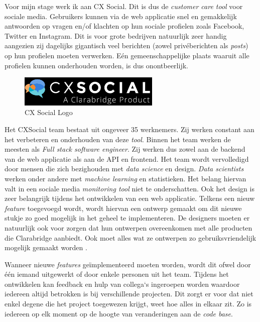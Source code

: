 Voor mijn stage werk ik aan CX Social. Dit is dus de \textit{customer care tool} voor sociale media. Gebruikers kunnen via de web applicatie snel en gemakkelijk antwoorden op vragen en/of klachten op hun sociale profielen zoals Facebook, Twitter en Instagram. Dit is voor grote bedrijven natuurlijk zeer handig aangezien zij dagelijks gigantisch veel berichten (zowel priv\'{e}berichten als \textit{posts}) op hun profielen moeten verwerken. E\'{e}n gemeenschappelijke plaats waaruit alle profielen kunnen onderhouden worden, is dus onontbeerlijk. 

\begin{figure}[H]
	\centering
	\includegraphics[width=0.6\textwidth]{Figuren/CXSocialLogo.png}
	\caption{CX Social Logo \cite{CXSOcialLogo}} 
	\label{fig:CXSocialLogo}
\end{figure} 

Het CXSocial team bestaat uit ongeveer 35 werknemers. Zij werken constant aan het verbeteren en onderhouden van deze \textit{tool}.  Binnen het team werken de meesten als \textit{Full stack software engineer}. Zij werken dus zowel aan de backend van de web applicatie als aan de API en frontend. Het team wordt vervolledigd door mensen die zich bezighouden met \textit{data science} en design. \textit{Data scientists} werken onder andere met \textit{machine learning} en statistieken. Het belang hiervan valt in een sociale media \textit{monitoring tool} niet te onderschatten. Ook het design is zeer belangrijk tijdens het ontwikkelen van een web applicatie. Telkens een nieuw \textit{feature} toegevoegd wordt, wordt hiervan een ontwerp gemaakt om dit nieuwe stukje zo goed mogelijk in het geheel te implementeren. De designers moeten er natuurlijk ook voor zorgen dat hun ontwerpen overeenkomen met alle producten die Clarabridge aanbiedt. Ook moet alles wat ze ontwerpen zo gebruiksvriendelijk mogelijk gemaakt worden \cite{EngagorTeam}. 

Wanneer nieuwe \textit{features} ge\"{i}mplementeerd moeten worden, wordt dit ofwel door \'{e}\'{e}n iemand uitgewerkt of door enkele personen uit het team. Tijdens het ontwikkelen kan feedback en hulp van collega`s ingeroepen worden waardoor iedereen altijd betrokken is bij verschillende projecten. Dit zorgt er voor dat niet enkel degene die het project toegewezen krijgt, weet hoe alles in elkaar zit. Zo is iedereen op elk moment op de hoogte van veranderingen aan de \textit{code base}. 

